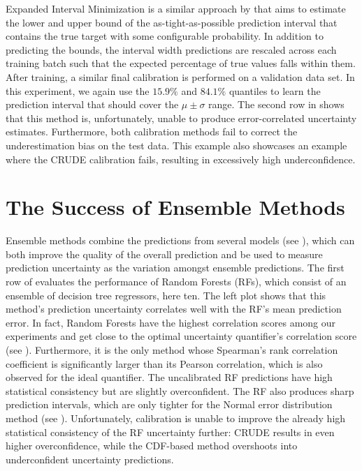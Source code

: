 \noindent Expanded Interval Minimization is a similar approach by \textcite{interval-minimisation-2018} that aims to estimate the lower and upper bound of the as-tight-as-possible prediction interval that contains the true target with some configurable probability. In addition to predicting the bounds, the interval width predictions are rescaled across each training batch such that the expected percentage of true values falls within them. After training, a similar final calibration is performed on a validation data set. In this experiment, we again use the $15.9\%$ and $84.1\%$ quantiles to learn the prediction interval that should cover the $\mu \pm \sigma$ range. The second row in  shows that this method is, unfortunately, unable to produce error-correlated uncertainty estimates. Furthermore, both calibration methods fail to correct the underestimation bias on the test data. This example also showcases an example where the CRUDE calibration fails, resulting in excessively high underconfidence.

\section{The Success of Ensemble Methods} \label{txt:uncertainty-ensemble-methods}

Ensemble methods combine the predictions from several models (see ), which can both improve the quality of the overall prediction and be used to measure prediction uncertainty as the variation amongst ensemble predictions. The first row of  evaluates the performance of Random Forests (RFs), which consist of an ensemble of decision tree regressors, here ten. The left plot shows that this method's prediction uncertainty correlates well with the RF's mean prediction error. In fact, Random Forests have the highest correlation scores among our experiments and get close to the optimal uncertainty quantifier's correlation score (see ). Furthermore, it is the only method whose Spearman's rank correlation coefficient is significantly larger than its Pearson correlation, which is also observed for the ideal quantifier. The uncalibrated RF predictions have high statistical consistency but are slightly overconfident. The RF also produces sharp prediction intervals, which are only tighter for the Normal error distribution method (see ). Unfortunately, calibration is unable to improve the already high statistical consistency of the RF uncertainty further: CRUDE results in even higher overconfidence, while the CDF-based method overshoots into underconfident uncertainty predictions.


